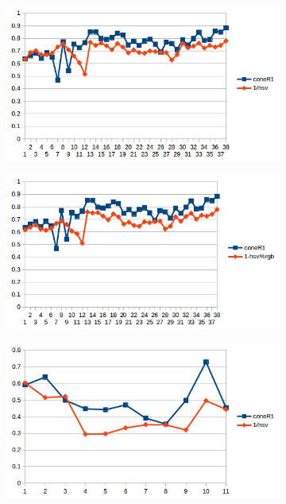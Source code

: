 \documentclass[12pt]{report}
\begin{document}
\begin{figure}
\begin{subfigure}{.49\linewidth}
\end{subfigure}
\hfill
\begin{subfigure}{.49\linewidth}
  \includegraphics[width=1\linewidth]{figures/correlations/db/campus_hsv.jpg}
  \caption{}
\end{subfigure}
\begin{subfigure}{.49\linewidth}
  \includegraphics[width=1\linewidth]{figures/correlations/rgb/campus_hsv.jpg}
  \caption{}
\end{subfigure}
\hfill
\begin{subfigure}{.49\linewidth}
  \includegraphics[width=1\linewidth]{figures/correlations/db/pets2_hsv.jpg}

\end{subfigure}
\end{figure}
\end{document}
